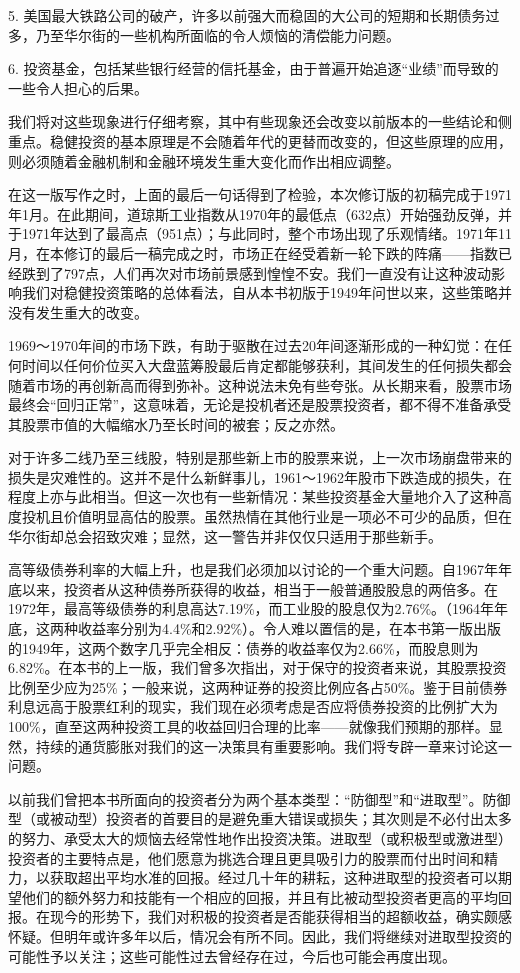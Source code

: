 \documentclass[12pt,oneside]{book}
\begin{document}
5. 美国最大铁路公司的破产，许多以前强大而稳固的大公司的短期和长期债务过多，乃至华尔街的一些机构所面临的令人烦恼的清偿能力问题。

6. 投资基金，包括某些银行经营的信托基金，由于普遍开始追逐“业绩”而导致的一些令人担心的后果。

我们将对这些现象进行仔细考察，其中有些现象还会改变以前版本的一些结论和侧重点。稳健投资的基本原理是不会随着年代的更替而改变的，但这些原理的应用，则必须随着金融机制和金融环境发生重大变化而作出相应调整。

在这一版写作之时，上面的最后一句话得到了检验，本次修订版的初稿完成于1971年1月。在此期间，道琼斯工业指数从1970年的最低点（632点）开始强劲反弹，并于1971年达到了最高点（951点）；与此同时，整个市场出现了乐观情绪。1971年11月，在本修订的最后一稿完成之时，市场正在经受着新一轮下跌的阵痛——指数已经跌到了797点，人们再次对市场前景感到惶惶不安。我们一直没有让这种波动影响我们对稳健投资策略的总体看法，自从本书初版于1949年问世以来，这些策略并没有发生重大的改变。

1969～1970年间的市场下跌，有助于驱散在过去20年间逐渐形成的一种幻觉：在任何时间以任何价位买入大盘蓝筹股最后肯定都能够获利，其间发生的任何损失都会随着市场的再创新高而得到弥补。这种说法未免有些夸张。从长期来看，股票市场最终会“回归正常”，这意味着，无论是投机者还是股票投资者，都不得不准备承受其股票市值的大幅缩水乃至长时间的被套；反之亦然。

对于许多二线乃至三线股，特别是那些新上市的股票来说，上一次市场崩盘带来的损失是灾难性的。这并不是什么新鲜事儿，1961～1962年股市下跌造成的损失，在程度上亦与此相当。但这一次也有一些新情况：某些投资基金大量地介入了这种高度投机且价值明显高估的股票。虽然热情在其他行业是一项必不可少的品质，但在华尔街却总会招致灾难；显然，这一警告并非仅仅只适用于那些新手。

高等级债券利率的大幅上升，也是我们必须加以讨论的一个重大问题。自1967年年底以来，投资者从这种债券所获得的收益，相当于一般普通股股息的两倍多。在1972年，最高等级债券的利息高达7.19\%，而工业股的股息仅为2.76\%。（1964年年底，这两种收益率分别为4.4\%和2.92\%）。令人难以置信的是，在本书第一版出版的1949年，这两个数字几乎完全相反：债券的收益率仅为2.66\%，而股息则为6.82\%。在本书的上一版，我们曾多次指出，对于保守的投资者来说，其股票投资比例至少应为25\%；一般来说，这两种证券的投资比例应各占50\%。鉴于目前债券利息远高于股票红利的现实，我们现在必须考虑是否应将债券投资的比例扩大为100\%，直至这两种投资工具的收益回归合理的比率——就像我们预期的那样。显然，持续的通货膨胀对我们的这一决策具有重要影响。我们将专辟一章来讨论这一问题。

以前我们曾把本书所面向的投资者分为两个基本类型：“防御型”和“进取型”。防御型（或被动型）投资者的首要目的是避免重大错误或损失；其次则是不必付出太多的努力、承受太大的烦恼去经常性地作出投资决策。进取型（或积极型或激进型）投资者的主要特点是，他们愿意为挑选合理且更具吸引力的股票而付出时间和精力，以获取超出平均水准的回报。经过几十年的耕耘，这种进取型的投资者可以期望他们的额外努力和技能有一个相应的回报，并且有比被动型投资者更高的平均回报。在现今的形势下，我们对积极的投资者是否能获得相当的超额收益，确实颇感怀疑。但明年或许多年以后，情况会有所不同。因此，我们将继续对进取型投资的可能性予以关注；这些可能性过去曾经存在过，今后也可能会再度出现。
\end{document}
